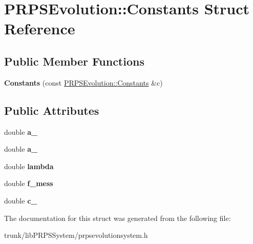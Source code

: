\hypertarget{struct_p_r_p_s_evolution_1_1_constants}{\section{P\-R\-P\-S\-Evolution\-:\-:Constants Struct Reference}
\label{struct_p_r_p_s_evolution_1_1_constants}
}
\subsection*{Public Member Functions}
\begin{DoxyCompactItemize}
\item 
\hypertarget{struct_p_r_p_s_evolution_1_1_constants_aeab0b34d417727d0be8cdc26a8e1edc3}{{\bfseries Constants} (const \hyperlink{struct_p_r_p_s_evolution_1_1_constants}{P\-R\-P\-S\-Evolution\-::\-Constants} \&c)}\label{struct_p_r_p_s_evolution_1_1_constants_aeab0b34d417727d0be8cdc26a8e1edc3}

\end{DoxyCompactItemize}
\subsection*{Public Attributes}
\begin{DoxyCompactItemize}
\item 
\hypertarget{struct_p_r_p_s_evolution_1_1_constants_a74a4e2d7cb4a447c8645252362b0212f}{double {\bfseries a\-\_}}\label{struct_p_r_p_s_evolution_1_1_constants_a74a4e2d7cb4a447c8645252362b0212f}

\item 
\hypertarget{struct_p_r_p_s_evolution_1_1_constants_af8ee2ccd3b06dad85eed4dbe4e9a82bc}{double {\bfseries a\-\_}}\label{struct_p_r_p_s_evolution_1_1_constants_af8ee2ccd3b06dad85eed4dbe4e9a82bc}

\item 
\hypertarget{struct_p_r_p_s_evolution_1_1_constants_ace86405b7931058d3c8fae37b1fb84ba}{double {\bfseries lambda}}\label{struct_p_r_p_s_evolution_1_1_constants_ace86405b7931058d3c8fae37b1fb84ba}

\item 
\hypertarget{struct_p_r_p_s_evolution_1_1_constants_ae5505f026f90560d42e3c86b5efa64e7}{double {\bfseries f\-\_\-mess}}\label{struct_p_r_p_s_evolution_1_1_constants_ae5505f026f90560d42e3c86b5efa64e7}

\item 
\hypertarget{struct_p_r_p_s_evolution_1_1_constants_a457de2084d859c1d171004547253a891}{double {\bfseries c\-\_}}\label{struct_p_r_p_s_evolution_1_1_constants_a457de2084d859c1d171004547253a891}

\end{DoxyCompactItemize}


The documentation for this struct was generated from the following file\-:\begin{DoxyCompactItemize}
\item 
trunk/lib\-P\-R\-P\-S\-System/prpsevolutionsystem.\-h\end{DoxyCompactItemize}
